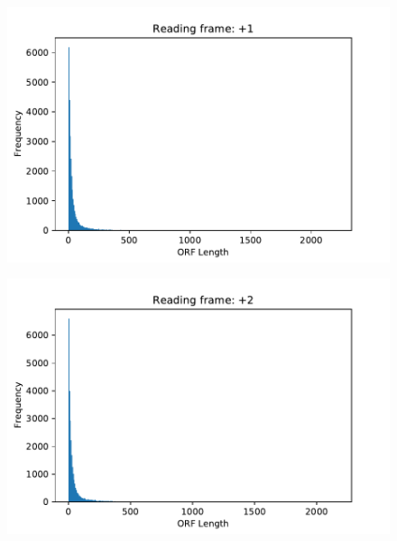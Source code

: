 \documentclass[a4paper]{article}
\begin{document}
\begin{enumerate}[label=(\alph*)]
\begin{figure}
        \centering
    \end{figure}
    \begin{figure}
        \includegraphics{q5f1.pdf}
        \centering
    \end{figure}
    \begin{figure}
        \includegraphics{q5f2.pdf}
        \centering
    \end{figure}
\end{enumerate}
\end{document}
